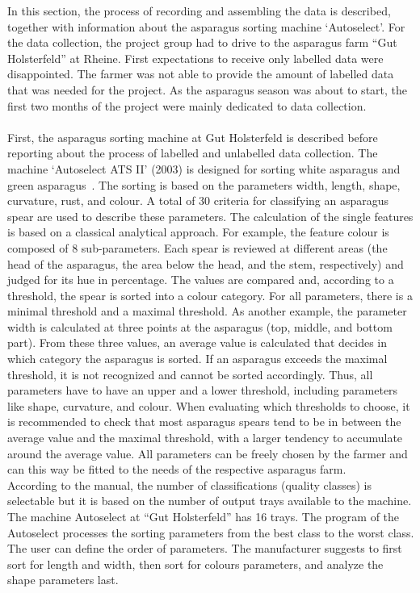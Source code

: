 In this section, the process of recording and assembling the data is described, together with information about the asparagus sorting machine ‘Autoselect’.
For the data collection, the project group had to drive to the asparagus farm “Gut Holsterfeld” at Rheine. First expectations to receive only labelled data were disappointed. The farmer was not able to provide the amount of labelled data that was needed for the project. As the asparagus season was about to start, the first two months of the project were mainly dedicated to data collection. \\
 \\
First, the asparagus sorting machine at Gut Holsterfeld is described before reporting about the process of labelled and unlabelled data collection.
The machine ‘Autoselect ATS II’ (2003) is designed for sorting white asparagus and green asparagus~\citep{autoselectanleitung}. The sorting is based on the parameters width, length, shape, curvature, rust, and colour. A total of 30 criteria for classifying an asparagus spear are used to describe these parameters. The calculation of the single features is based on a classical analytical approach. For example, the feature colour is composed of 8 sub-parameters. Each spear is reviewed at different areas (the head of the asparagus, the area below the head, and the stem, respectively) and judged for its hue in percentage. The values are compared and, according to a threshold, the spear is sorted into a colour category. For all parameters, there is a minimal threshold and a maximal threshold. As another example, the parameter width is calculated at three points at the asparagus (top, middle, and bottom part). From these three values, an average value is calculated that decides in which category the asparagus is sorted. If an asparagus exceeds the maximal threshold, it is not recognized and cannot be sorted accordingly. Thus, all parameters have to have an upper and a lower threshold, including parameters like shape, curvature, and colour. When evaluating which thresholds to choose, it is recommended to check that most asparagus spears tend to be in between the average value and the maximal threshold, with a larger tendency to accumulate around the average value. All parameters can be freely chosen by the farmer and can this way be fitted to the needs of the respective asparagus farm. \\
According to the manual, the number of classifications (quality classes) is selectable but it is based on the number of output trays available to the machine. The machine Autoselect at “Gut Holsterfeld” has 16 trays. The program of the Autoselect processes the sorting parameters from the best class to the worst class. The user can define the order of parameters. The manufacturer suggests to first sort for length and width, then sort for colours parameters, and analyze the shape parameters last. 


